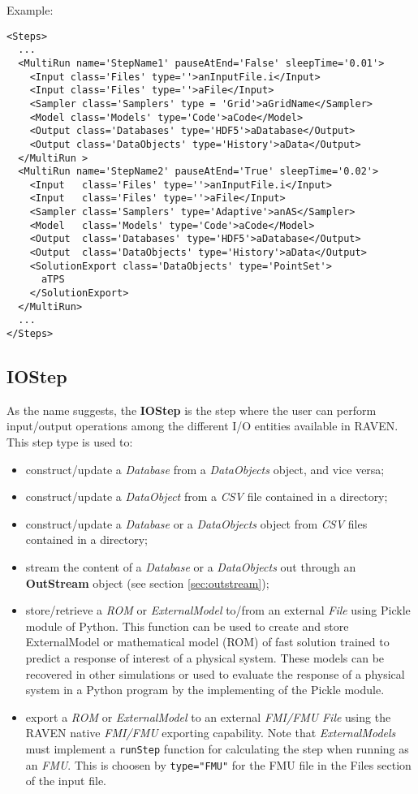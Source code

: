 Example:
\begin{lstlisting}[style=XML,morekeywords={pauseAtEnd,sleepTime,class}]
<Steps>
  ...
  <MultiRun name='StepName1' pauseAtEnd='False' sleepTime='0.01'>
    <Input class='Files' type=''>anInputFile.i</Input>
    <Input class='Files' type=''>aFile</Input>
    <Sampler class='Samplers' type = 'Grid'>aGridName</Sampler>
    <Model class='Models' type='Code'>aCode</Model>
    <Output class='Databases' type='HDF5'>aDatabase</Output>
    <Output class='DataObjects' type='History'>aData</Output>
  </MultiRun >
  <MultiRun name='StepName2' pauseAtEnd='True' sleepTime='0.02'>
    <Input   class='Files' type=''>anInputFile.i</Input>
    <Input   class='Files' type=''>aFile</Input>
    <Sampler class='Samplers' type='Adaptive'>anAS</Sampler>
    <Model   class='Models' type='Code'>aCode</Model>
    <Output  class='Databases' type='HDF5'>aDatabase</Output>
    <Output  class='DataObjects' type='History'>aData</Output>
    <SolutionExport class='DataObjects' type='PointSet'>
      aTPS
    </SolutionExport>
  </MultiRun>
  ...
</Steps>
\end{lstlisting}

\subsection{IOStep}
\label{subsec:stepIOStep}
As the name suggests, the \textbf{IOStep} is the step where the user can perform
input/output operations among the different I/O entities available in RAVEN.
%
This step type is used to:
\begin{itemize}
 \item construct/update a \textit{Database} from a \textit{DataObjects} object, and
   vice versa;
 \item construct/update a \textit{DataObject} from a
   \textit{CSV} file contained in a directory;
 \item construct/update a \textit{Database} or a \textit{DataObjects} object from
   \textit{CSV} files contained in a directory;
 \item stream the content of a \textit{Database} or a \textit{DataObjects} out through
   an \textbf{OutStream} object (see section \ref{sec:outstream});
 \item store/retrieve a \textit{ROM} or  \textit{ExternalModel} to/from an external \textit{File} using Pickle module
 of Python. This function can be used to create and store ExternalModel or mathematical model (ROM) of fast solution
 trained to predict a response of interest of a physical system. These models can be
recovered in other simulations or used to evaluate the response of a physical system
 in a Python program by the implementing of the Pickle module.
  \item export a \textit{ROM} or  \textit{ExternalModel} to an external \textit{FMI/FMU}  \textit{File} using the RAVEN native
  \textit{FMI/FMU} exporting capability. Note that \textit{ExternalModels} must implement a \texttt{runStep} function for calculating the step when running as an \textit{FMU}.  This is choosen by \verb|type="FMU"| for the FMU file in the Files section of the input file.
\end{itemize}

